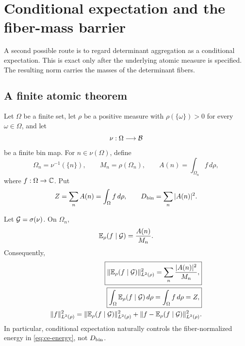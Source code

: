 \section{Conditional expectation and the fiber-mass barrier}
\label{sec:conditional-expectation}

A second possible route is to regard determinant aggregation as a
conditional expectation.  This is exact only after the underlying
atomic measure is specified.  The resulting norm carries the masses
of the determinant fibers.

\subsection{A finite atomic theorem}

Let \(\Omega\) be a finite set, let \(\rho\) be a positive measure with
\(\rho(\{\omega\})>0\) for every \(\omega\in\Omega\), and let
\[
 \nu:\Omega\longrightarrow\mathcal B
\]
be a finite bin map.  For \(n\in\nu(\Omega)\), define
\begin{equation}
 \Omega_n=\nu^{-1}(\{n\}),\qquad
 M_n=\rho(\Omega_n),\qquad
 A(n)=\int_{\Omega_n}f\,d\rho,
 \label{eq:ce-fibers}
\end{equation}
where \(f:\Omega\to\mathbb C\).  Put
\begin{equation}
 Z=\sum_nA(n)=\int_\Omega f\,d\rho,
 \qquad
 D_{\rm bin}=\sum_n|A(n)|^2.
 \label{eq:ce-Z-D}
\end{equation}

\begin{theorem}
\label{thm:ce-normalization}
Let \(\mathcal G=\sigma(\nu)\).  On \(\Omega_n\),
\begin{equation}
 \mathbb E_\rho(f\mid\mathcal G)=\frac{A(n)}{M_n}.
 \label{eq:ce-formula}
\end{equation}
Consequently,
\begin{align}
 \boxed{
 \|\mathbb E_\rho(f\mid\mathcal G)\|_{L^2(\rho)}^2
 =\sum_n\frac{|A(n)|^2}{M_n},}
 \label{eq:ce-energy}\\
 \boxed{
 \int_\Omega\mathbb E_\rho(f\mid\mathcal G)\,d\rho
 =\int_\Omega f\,d\rho=Z,}
 \label{eq:ce-preserves-Z}\\
 \|f\|_{L^2(\rho)}^2
 =\|\mathbb E_\rho(f\mid\mathcal G)\|_{L^2(\rho)}^2
 +\|f-\mathbb E_\rho(f\mid\mathcal G)\|_{L^2(\rho)}^2.
 \label{eq:ce-pythagoras}
\end{align}
In particular, conditional expectation naturally controls the
fiber-normalized energy in \eqref{eq:ce-energy}, not
\(D_{\rm bin}\).
\end{theorem}

